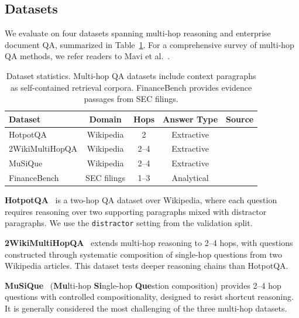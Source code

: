 
\subsection{Datasets}
\label{subsec:datasets}

We evaluate \ours{} on four datasets spanning multi-hop reasoning and enterprise document QA, summarized in Table~\ref{tab:datasets}.
For a comprehensive survey of multi-hop QA methods, we refer readers to Mavi et al.~\cite{mavi2024multihop}.

\begin{table}[t]
\centering
\caption{Dataset statistics. Multi-hop QA datasets include context paragraphs as self-contained retrieval corpora. FinanceBench provides evidence passages from SEC filings.}
\label{tab:datasets}
\begin{tabular}{lcccc}
\toprule
\textbf{Dataset} & \textbf{Domain} & \textbf{Hops} & \textbf{Answer Type} & \textbf{Source} \\
\midrule
HotpotQA & Wikipedia & 2 & Extractive & \cite{yang2018hotpotqa} \\
2WikiMultiHopQA & Wikipedia & 2--4 & Extractive & \cite{ho2020wiki2multi} \\
MuSiQue & Wikipedia & 2--4 & Extractive & \cite{trivedi2022musique} \\
FinanceBench & SEC filings & 1--3 & Analytical & \cite{financebench2023} \\
\bottomrule
\end{tabular}
\end{table}

\textbf{HotpotQA}~\cite{yang2018hotpotqa} is a two-hop QA dataset over Wikipedia, where each question requires reasoning over two supporting paragraphs mixed with distractor paragraphs.
We use the \texttt{distractor} setting from the validation split.

\textbf{2WikiMultiHopQA}~\cite{ho2020wiki2multi} extends multi-hop reasoning to 2--4 hops, with questions constructed through systematic composition of single-hop questions from two Wikipedia articles.
This dataset tests deeper reasoning chains than HotpotQA.

\textbf{MuSiQue}~\cite{trivedi2022musique} (\textbf{Mu}lti-hop \textbf{Si}ngle-hop \textbf{Que}stion composition) provides 2--4 hop questions with controlled compositionality, designed to resist shortcut reasoning.
It is generally considered the most challenging of the three multi-hop datasets.

